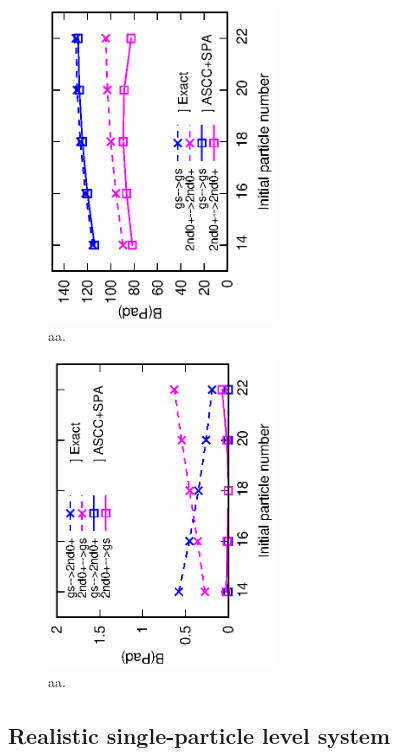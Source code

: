 \documentclass[%
superscriptaddress,
showpacs,
nofootinbib,
amsmath,amssymb,
aps,
prc,
twocolumn,
floatfix ]%
{revtex4-1}
\begin{document}
\begin{figure}[t]
 \begin{center}
  \includegraphics[width=60mm,angle=-90]{intra_trans.eps}
 \end{center}
 \captionsetup{labelformat=empty,labelsep=none}
	\caption{aa.
}
 \label{3levelPad}
\end{figure}

\begin{figure}[t]
 \begin{center}
  \includegraphics[width=60mm,angle=-90]{inter_trans.eps}
 \end{center}
 \captionsetup{labelformat=empty,labelsep=none}
	\caption{aa.
}
 \label{3levelPad}
\end{figure}

\subsection{Realistic single-particle level system}
\end{document}
